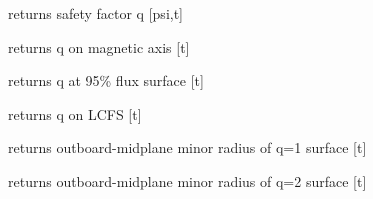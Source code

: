 \documentclass[letterpaper,10pt,english]{sphinxmanual}
\begin{document}
\begin{fulllineitems}
\begin{fulllineitems}
\begin{quote}
\begin{description}
\end{description}\end{quote}

\end{fulllineitems}


\begin{fulllineitems}
\label{eqtools:eqtools.EFIT.EFITTree.getQProfile}
returns safety factor q {[}psi,t{]}

\end{fulllineitems}


\begin{fulllineitems}
\label{eqtools:eqtools.EFIT.EFITTree.getQ0}
returns q on magnetic axis {[}t{]}

\end{fulllineitems}


\begin{fulllineitems}
\label{eqtools:eqtools.EFIT.EFITTree.getQ95}
returns q at 95\% flux surface {[}t{]}

\end{fulllineitems}


\begin{fulllineitems}
\label{eqtools:eqtools.EFIT.EFITTree.getQLCFS}
returns q on LCFS {[}t{]}

\end{fulllineitems}


\begin{fulllineitems}
\label{eqtools:eqtools.EFIT.EFITTree.getQ1Surf}
returns outboard-midplane minor radius of q=1 surface {[}t{]}

\end{fulllineitems}


\begin{fulllineitems}
\label{eqtools:eqtools.EFIT.EFITTree.getQ2Surf}
returns outboard-midplane minor radius of q=2 surface {[}t{]}


\end{fulllineitems}
\end{fulllineitems}
\end{document}
